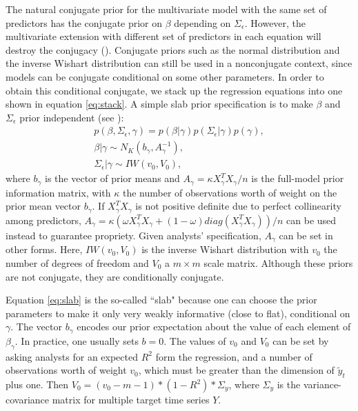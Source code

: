 \documentclass[twoside,11pt]{article}
\begin{document}
The natural conjugate prior for the multivariate model with the same set of predictors has the conjugate prior on $\beta$ depending on $\Sigma_\epsilon$. However, the multivariate extension with different set of predictors in each equation will destroy the conjugacy (\cite{rossi2012bayesian}). Conjugate priors such as the normal distribution and the inverse Wishart distribution can still be used in a nonconjugate context, since models can be conjugate conditional on some other parameters.
In order to obtain this conditional conjugate, we stack up the regression equations into one shown in equation \eqref{eq:stack}.
A simple slab prior specification is to make $\beta$ and $\Sigma_\epsilon$ prior independent (see \citealp{griffiths2003bayesian}):
\begin{equation} \label{eq:slab}
\begin{gathered}
p(\beta,\Sigma_\epsilon,\gamma)=p(\beta|\gamma)p(\Sigma_\epsilon|\gamma)p(\gamma),\\
\beta|\gamma \sim N_K(b_\gamma,A_\gamma^{-1}),\\
\Sigma_\epsilon|\gamma\sim IW(v_0,V_0),
\end{gathered}
\end{equation}
where $b_\gamma$ is the vector of prior means 
and $A_\gamma=\kappa X^T_\gamma X_\gamma/n$ is the full-model prior information matrix, with $\kappa$ the number of observations worth of weight on the prior mean vector $b_\gamma$. If $X^T_\gamma X_\gamma$ is not positive definite due to perfect collinearity among predictors,   $A_\gamma=\kappa(\omega X_\gamma^TX_\gamma+(1-\omega)diag(X_\gamma^TX_\gamma))/n$ can be used instead to guarantee propriety. Given analysts' specification, $A_\gamma$ can be set in other forms. Here, $IW(v_0,V_0)$ is the inverse Wishart distribution with $v_0$ the number of degrees of freedom and $V_0$ a $m\times m$ scale matrix. Although these priors are not conjugate, they are conditionally conjugate.

Equation \eqref{eq:slab} is the so-called ``slab" because one can choose the prior parameters to make it only very weakly informative (close to flat), conditional on $\gamma$.  The vector $b_\gamma$ encodes our prior expectation about the value of each element of $\beta_\gamma$. In practice, one usually sets $b=0$. The values of $v_0$ and $V_0$ can be set by asking analysts for an expected $R^2$ form the regression, and a number of observations worth of weight $v_0$, which must be greater than the dimension of $\tilde{y}_t$ plus one. Then $V_0=(v_0-m-1)*(1-R^2)*\Sigma_y$, where $\Sigma_y$ is the variance-covariance matrix for multiple target time series $Y$.
\end{document}
